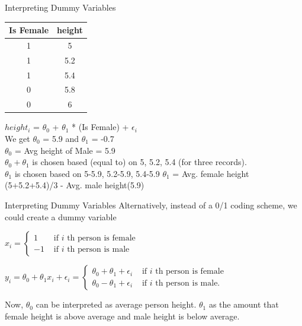 \documentclass{beamer}
\begin{document}
    \begin{frame}{Interpreting Dummy Variables}
    \begin{center}
        \pause \begin{tabular}{c|c}
            Is Female& height\\
            \hline
            \hline
            1 & 5 \\
            1 & 5.2 \\
            1 & 5.4 \\
            0 & 5.8 \\
            0 & 6 \\
        \end{tabular}
    \end{center}
    \pause $height_{i}$ = $\theta_{0}$ + $\theta_{1}$ *  (Is Female) + $\epsilon_{i}$\\
    \vspace{1em}
    \pause We get $\theta_0$ = 5.9 and $\theta_1$ = -0.7\\
    \pause $\theta_{0}$ = Avg height of Male = 5.9\\
    \pause $\theta_{0} + \theta_{1}$ is chosen based (equal to) on 5, 5.2, 5.4 (for three records). \\
    \pause $\theta_{1}$ is chosen based on 5-5.9, 5.2-5.9, 5.4-5.9
    \pause $\theta_{1}$ = Avg. female height (5+5.2+5.4)/3 - Avg. male height(5.9)
    \end{frame}
    
    \begin{frame}{Interpreting Dummy Variables}
    Alternatively, instead of a 0/1 coding scheme, we could create a dummy variable
    
    \pause \(x_{i}=\left\{\begin{array}{ll}{1} & {\text { if } i \text { th person is female }} \\ {-1} & {\text { if } i \text { th person is male }}\end{array}\right.\)
    
    \pause \(y_{i}=\theta_{0}+\theta_{1} x_{i}+\epsilon_{i}=\left\{\begin{array}{ll}{\theta_{0}+\theta_{1}+\epsilon_{i}} & {\text { if } i \text { th person is female }} \\ {\theta_{0}-\theta_{1}+\epsilon_{i}} & {\text { if } i \text { th person is male. }}\end{array}\right.\)
    
    
    \pause Now, $\theta_{0}$ can be interpreted as average person height. $\theta_{1}$ as the amount that female height is above average and male height is below average.
\end{frame}
\end{document}
